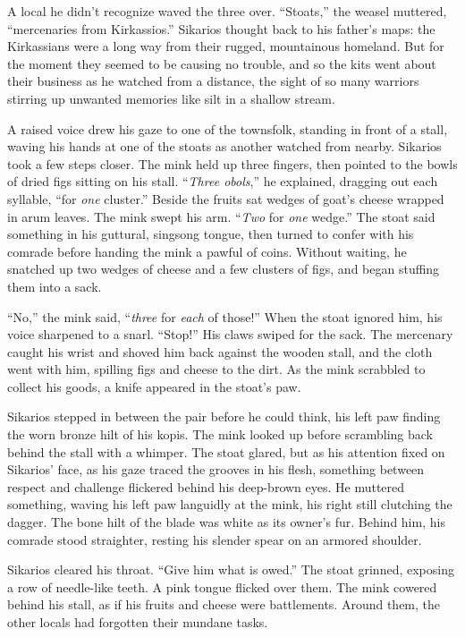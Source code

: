 A local he didn't recognize waved the three over. ``Stoats,'' the weasel muttered, ``mercenaries from Kirkassios.'' Sikarios thought back to his father's maps: the Kirkassians were a long way from their rugged, mountainous homeland. But for the moment they seemed to be causing no trouble, and so the kits went about their business as he watched from a distance, the sight of so many warriors stirring up unwanted memories like silt in a shallow stream.

A raised voice drew his gaze to one of the townsfolk, standing in front of a stall, waving his hands at one of the stoats as another watched from nearby. Sikarios took a few steps closer. The mink held up three fingers, then pointed to the bowls of dried figs sitting on his stall. ``\emph{Three obols},'' he explained, dragging out each syllable, ``for \emph{one} cluster.'' Beside the fruits sat wedges of goat's cheese wrapped in arum leaves. The mink swept his arm. ``\emph{Two} for \emph{one} wedge.'' The stoat said something in his guttural, singsong tongue, then turned to confer with his comrade before handing the mink a pawful of coins. Without waiting, he snatched up two wedges of cheese and a few clusters of figs, and began stuffing them into a sack.

``No,'' the mink said, ``\emph{three} for \emph{each} of those!'' When the stoat ignored him, his voice sharpened to a snarl. ``Stop!'' His claws swiped for the sack. The mercenary caught his wrist and shoved him back against the wooden stall, and the cloth went with him, spilling figs and cheese to the dirt. As the mink scrabbled to collect his goods, a knife appeared in the stoat's paw.

Sikarios stepped in between the pair before he could think, his left paw finding the worn bronze hilt of his kopis. The mink looked up before scrambling back behind the stall with a whimper. The stoat glared, but as his attention fixed on Sikarios' face, as his gaze traced the grooves in his flesh, something between respect and challenge flickered behind his deep-brown eyes. He muttered something, waving his left paw languidly at the mink, his right still clutching the dagger. The bone hilt of the blade was white as its owner's fur. Behind him, his comrade stood straighter, resting his slender spear on an armored shoulder.

Sikarios cleared his throat. ``Give him what is owed.'' The stoat grinned, exposing a row of needle-like teeth. A pink tongue flicked over them. The mink cowered behind his stall, as if his fruits and cheese were battlements. Around them, the other locals had forgotten their mundane tasks.

